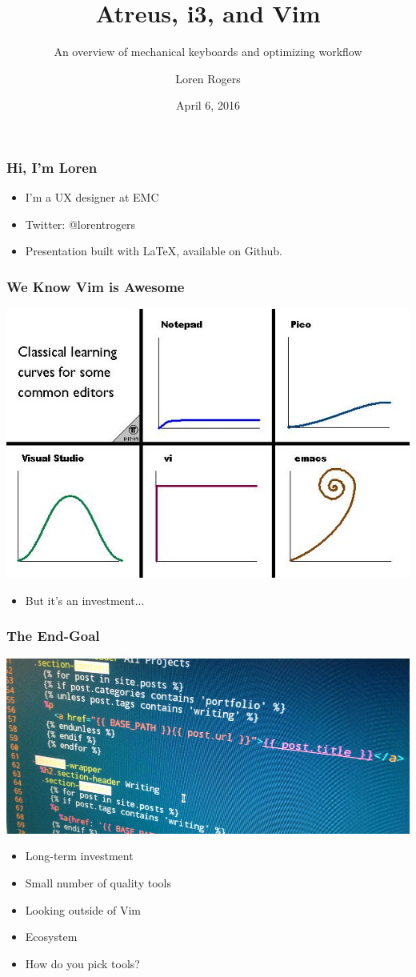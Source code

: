 \documentclass{beamer}
\title{Atreus, i3, and Vim}
\subtitle{An overview of mechanical keyboards and optimizing workflow}
\author{Loren Rogers}
\date{April 6, 2016}
\begin{document}
\maketitle

\begin{frame}
  \frametitle{Hi, I'm Loren}
  \begin{itemize}
    \item I'm a UX designer at EMC
    \item Twitter: @lorentrogers
    \item Presentation built with \LaTeX, available on Github.
  \end{itemize}
\end{frame}

\begin{frame}
  \frametitle{We Know Vim is Awesome}
  \includegraphics[scale=0.5]{images/curves}
  \begin{itemize}
    \item But it's an investment...
  \end{itemize}
\end{frame}

\begin{frame}
  \frametitle{The End-Goal}
  \includegraphics[scale=0.2]{images/vim}

  \begin{itemize}
    \item Long-term investment
    \item Small number of quality tools
    \item Looking outside of Vim
    \item Ecosystem
    \item How do you pick tools?
  \end{itemize}
\end{frame}
\end{document}
